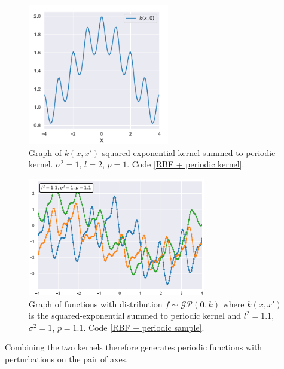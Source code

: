 \begin{figure}[h]
    \centering
    \includegraphics[width=0.55\textwidth]{images/Gaussian process/RBF + periodic kernel.pdf}
    \caption{Graph of $k(x,x')$ squared-exponential kernel summed to periodic kernel. $\sigma^2=1$, $l=2$, $p=1$. Code \ref{RBF + periodic kernel}.}
    \label{SE + periodic kernel}
\end{figure}



\begin{figure}[h]
    \centering    \includegraphics[width=0.69\textwidth]{images/Gaussian process/RBF + periodic sample.pdf}
    \caption{Graph of functions with distribution  $f\sim \mathcal{GP}(\bm{0},k)$ where $k(x,x')$ is the squared-exponential summed to periodic kernel and $l^2=1.1$, $\sigma^2=1$, $p=1.1$. Code \ref{RBF + periodic sample}.}
    \label{SE + periodic sample}
\end{figure}

Combining the two kernels therefore generates periodic functions with perturbations on the pair of axes.

\newpage

